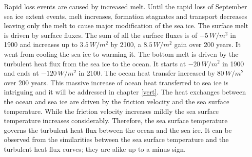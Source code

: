 


Rapid loss events are caused by increased melt.  Until the rapid loss of September sea ice extent events, melt increases, formation stagnates and transport decreases leaving only the melt to cause major modification of the sea ice. The surface melt is driven by surface fluxes. The sum of all the surface fluxes is of $-5\,W/m^2$ in 1900 and increases up to $3.5\,W/m^2$ by 2100, a $8.5\,W/m^2$ gain over 200 years. It went from cooling the sea ice to warming it. The bottom melt is driven by the turbulent heat flux from the sea ice to the ocean. It starts at $-20\,W/m^2$ in 1900 and ends at $-120\,W/m^2$ in 2100. The ocean heat transfer increased by $80\,W/m^2$ over 200 years. This massive increase of ocean heat transferred to sea ice is intriguing and it will be addressed in chapter \ref{vert}. The heat exchanges between the ocean and sea ice are driven by the friction velocity and the sea surface temperature. While the friction velocity increases mildly the sea surface temperature increases considerably. Therefore, the sea surface temperature governs the turbulent heat flux between the ocean and the sea ice. It can be observed from the similarities between the sea surface temperature and the turbulent heat flux curves; they are alike up to a minus sign.

